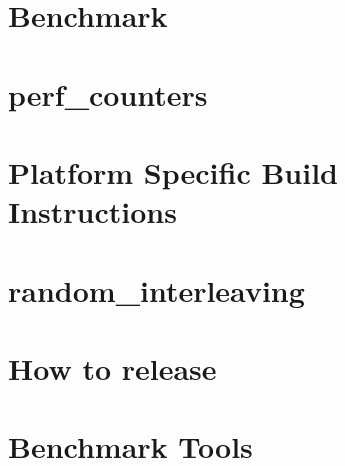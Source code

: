 \let\mypdfximage\pdfximage\def\pdfximage{\immediate\mypdfximage}\documentclass[twoside]{book}
\newcommand{\+}{\discretionary{\mbox{\scriptsize$\hookleftarrow$}}{}{}}
\begin{document}
\chapter{Benchmark}
\label{md__home_mary_VegaProgramEngineering_2024_build__deps_googlebenchmark-src_docs_index}

\chapter{perf\+\_\+counters}
\label{md__home_mary_VegaProgramEngineering_2024_build__deps_googlebenchmark-src_docs_perf_counters}

\chapter{Platform Specific Build Instructions}
\label{md__home_mary_VegaProgramEngineering_2024_build__deps_googlebenchmark-src_docs_platform_specific_build_instructions}

\chapter{random\+\_\+interleaving}
\label{md__home_mary_VegaProgramEngineering_2024_build__deps_googlebenchmark-src_docs_random_interleaving}

\chapter{How to release}
\label{md__home_mary_VegaProgramEngineering_2024_build__deps_googlebenchmark-src_docs_releasing}

\chapter{Benchmark Tools}
\label{md__home_mary_VegaProgramEngineering_2024_build__deps_googlebenchmark-src_docs_tools}

\end{document}
